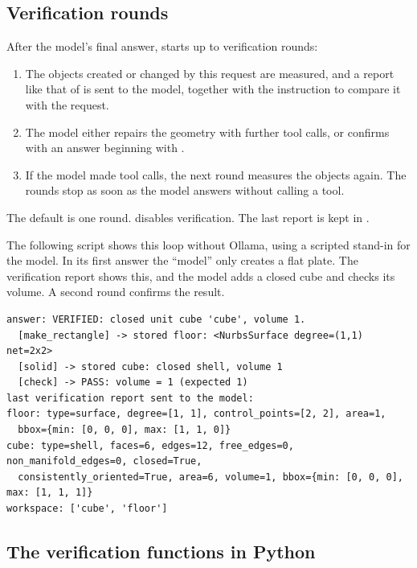 \subsection{Verification rounds}

After the model's final answer,  starts up to 
verification rounds:
\begin{enumerate}
  \item The objects created or changed by this request are measured, and a report like that of
     is sent to the model, together with the instruction to compare it with the
    request.
  \item The model either repairs the geometry with further tool calls, or confirms with an
    answer beginning with .
  \item If the model made tool calls, the next round measures the objects again. The rounds
    stop as soon as the model answers without calling a tool.
\end{enumerate}
The default is one round.  disables verification. The last report is
kept in .

The following script shows this loop without Ollama, using a scripted stand-in for the model.
In its first answer the ``model'' only creates a flat plate. The verification report shows
this, and the model adds a closed cube and checks its volume. A second round confirms the
result.


\begin{lstlisting}[style=text]
answer: VERIFIED: closed unit cube 'cube', volume 1.
  [make_rectangle] -> stored floor: <NurbsSurface degree=(1,1) net=2x2>
  [solid] -> stored cube: closed shell, volume 1
  [check] -> PASS: volume = 1 (expected 1)
last verification report sent to the model:
floor: type=surface, degree=[1, 1], control_points=[2, 2], area=1,
  bbox={min: [0, 0, 0], max: [1, 1, 0]}
cube: type=shell, faces=6, edges=12, free_edges=0, non_manifold_edges=0, closed=True,
  consistently_oriented=True, area=6, volume=1, bbox={min: [0, 0, 0], max: [1, 1, 1]}
workspace: ['cube', 'floor']
\end{lstlisting}

\subsection{The verification functions in Python}

